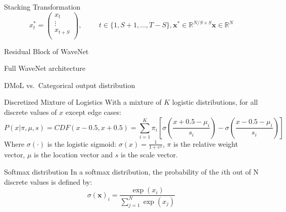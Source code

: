 \documentclass[
  ignorenonframetext,
  aspectratio=169,
]{beamer}
\begin{document}
\begin{frame}{Stacking Transformation}
\protect\hypertarget{stacking-transformation}{}
\[
x^*_t = \begin{pmatrix}
        x_{t} \\ \vdots \\ x_{t+S} \\
    \end{pmatrix},
    \hspace{1cm}
    t\in\{1,S+1,\dots,T-S\}, \mathbf{x}^*\in\mathbb{R}^{N/S \times S}\mathbf{x}\in\mathbb{R}^{N}
\]
\end{frame}

\begin{frame}{Residual Block of WaveNet}
\protect\hypertarget{residual-block-of-wavenet}{}
\begin{figure}
    \centering
    \resizebox{!}{0.9\textheight}{
    
   }
\end{figure}
\end{frame}

\begin{frame}{Full WaveNet architecture}
\protect\hypertarget{full-wavenet-architecture}{}
\begin{figure}
    \centering
    \resizebox{!}{0.9\textheight}{
    
   }
\end{figure}
\end{frame}

\begin{frame}{DMoL vs.~Categorical output distribution}
\protect\hypertarget{dmol-vs.-categorical-output-distribution}{}
\begin{block}{Discretized Mixture of Logistics}
\protect\hypertarget{discretized-mixture-of-logistics}{}
With a mixture of \(K\) logistic distributions, for all discrete values
of \(x\) except edge cases: \[
P(x|\pi, \mu, s) =CDF(x-0.5, x+0.5) = \sum_{i=1}^K \pi_i[\sigma(\frac{x +0.5 - \mu_i}{s_i}) - \sigma(\frac{x-0.5-\mu_i}{s_i}) ]
\] Where \(\sigma(\cdot )\) is the logistic sigmoid:
\(\sigma(x) = \frac{1}{1+e^x}\), \(\pi\) is the relative weight vector,
\(\mu\) is the location vector and \(s\) is the scale vector.
\end{block}

\begin{block}{Softmax distribution}
\protect\hypertarget{softmax-distribution}{}
In a softmax distribution, the probability of the \(i\)th out of N
discrete values is defined by: \[
\sigma(\mathbf{x})_i = \frac{\exp(x_i)}{\sum_{j=1}^N \exp(x_j)}
\]
\end{block}
\end{frame}
\end{document}
